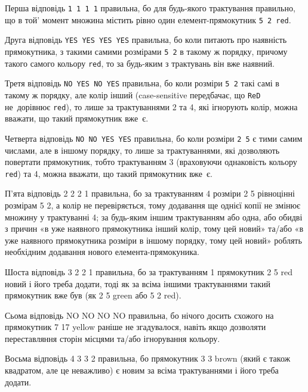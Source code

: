 \Examples

\begin{example}
\end{example}

\Note

Перша відповідь {\tt 1 1 1 1} правильна, бо для будь-якого трактування правильно, що в той' момент множина містить рівно один елемент-прямокутник {\tt 5 2 red}.

Друга відповідь {\tt YES YES YES YES} правильна, бо коли питають про наявність прямокутника, з такими самими розмірами {\tt 5 2} в такому ж порядку, причому такого самого кольору {\tt red}, то за будь-яким з трактувань він вже наявний.

Третя відповідь {\tt NO YES NO YES} правильна, бо коли розміри {\tt 5 2} такі самі в такому ж порядку, але колір інший (case-sensitive передбачає, що {\tt ReD} не~дорівнює {\tt red}), то лише за трактуваннями 2 та 4, які ігнорують колір, можна вважати, що такий прямокутник вже~є.

Четверта відповідь {\tt NO NO YES YES} правильна, бо коли розміри {\tt 2 5} є тими самим числами, але в іншому порядку, то лише за трактуваннями, які дозволяють повертати прямокутник, тобто трактуванням 3 (враховуючи однаковість кольору {\tt red}) та 4, можна вважати, що такий прямокутник вже~є.

П'ята відповідь 2 2 2 1 правильна, бо за трактуванням 4 розміри 2 5 рівноцінні розмірам 5 2, а колір не перевіряється, тому додавання ще однієї копії не змінює множину у трактуванні 4; за будь-яким іншим трактуванням або одна, або обидві з причин «в уже наявного прямокутника інший колір, тому цей новий» та/або «в уже наявного прямокутника розміри в іншому порядку, тому цей новий» роблять необхідним додавання нового елемента-прямокуника.

Шоста відповідь 3 2 2 1 правильна, бо за трактуванням 1 прямокутник 2 5 red новий і його треба додати, тоді як за всіма іншими трактуваннями такий прямокутник вже був (як 2 5 green або 5 2 red).

Сьома відповідь NO NO NO NO правильна, бо нічого досить схожого на прямокутник 7 17 yellow раніше не згадувалося, навіть якщо дозволяти переставляння сторін місцями та/або ігнорування кольору.

Восьма відповідь 4 3 3 2 правильна, бо прямокутник 3 3 brown (який є також квадратом, але це неважливо) є новим за всіма трактуваннями і його треба додати.

